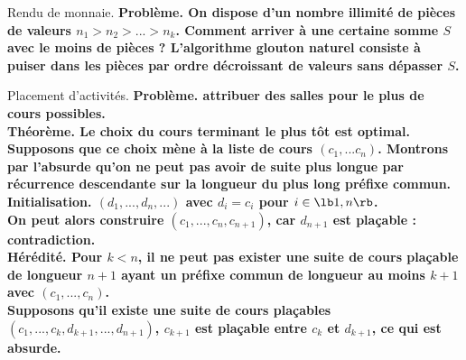 \documentclass[french, 11pt]{article}
\begin{document}
\begin{ex}{Rendu de monnaie.}{}
    \bf{Problème.} On dispose d'un nombre illimité de pièces de valeurs $n_1>n_2>...>n_k$. Comment arriver à une certaine somme $S$ avec le moins de pièces ?\n
    L'algorithme glouton naturel consiste à puiser dans les pièces par ordre décroissant de valeurs sans dépasser $S$.
\end{ex}

\begin{ex}{Placement d'activités.}{}
    \bf{Problème.} attribuer des salles pour le plus de cours possibles.\\
    \bf{Théorème.} Le choix du cours terminant le plus tôt est optimal.
    \tcblower
    Supposons que ce choix mène à la liste de cours $(c_1,...c_n)$. Montrons par l'absurde qu'on ne peut pas avoir de suite plus longue par récurrence descendante sur la longueur du plus long préfixe commun.\\
    \bf{Initialisation.} $(d_1,...,d_n,...)$ avec $d_i=c_i$ pour $i\in\lb1,n\rb$.\\
    On peut alors construire $(c_1,...,c_n,c_{n+1})$, car $d_{n+1}$ est plaçable : contradiction.\\
    \bf{Hérédité.} Pour $k<n$, il ne peut pas exister une suite de cours plaçable de longueur $n+1$ ayant un préfixe commun de longueur au moins $k+1$ avec $(c_1,...,c_n)$.\\
    Supposons qu'il existe une suite de cours plaçables $(c_1,...,c_k,d_{k+1},...,d_{n+1})$, $c_{k+1}$ est plaçable entre $c_k$ et $d_{k+1}$, ce qui est absurde.
\end{ex}

\vspace*{-0.7cm}
\end{document}
